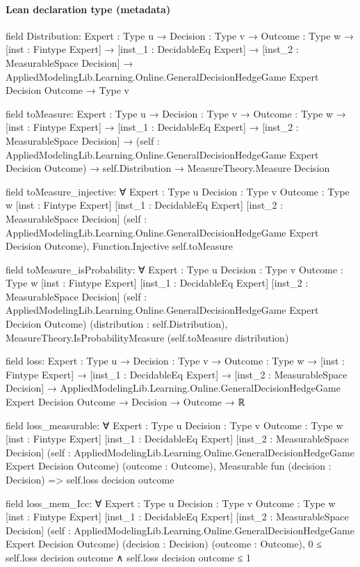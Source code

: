 \documentclass[10pt]{article}
\begin{document}
\paragraph{Lean declaration type (metadata)}
\begin{ReviewVerbatim}
field Distribution:
{Expert : Type u} →
  {Decision : Type v} →
    {Outcome : Type w} →
      [inst : Fintype Expert] →
        [inst_1 : DecidableEq Expert] →
          [inst_2 : MeasurableSpace Decision] →
            AppliedModelingLib.Learning.Online.GeneralDecisionHedgeGame Expert Decision Outcome → Type v

field toMeasure:
{Expert : Type u} →
  {Decision : Type v} →
    {Outcome : Type w} →
      [inst : Fintype Expert] →
        [inst_1 : DecidableEq Expert] →
          [inst_2 : MeasurableSpace Decision] →
            (self : AppliedModelingLib.Learning.Online.GeneralDecisionHedgeGame Expert Decision Outcome) →
              self.Distribution → MeasureTheory.Measure Decision

field toMeasure_injective:
∀ {Expert : Type u} {Decision : Type v} {Outcome : Type w} [inst : Fintype Expert] [inst_1 : DecidableEq Expert]
  [inst_2 : MeasurableSpace Decision]
  (self : AppliedModelingLib.Learning.Online.GeneralDecisionHedgeGame Expert Decision Outcome),
  Function.Injective self.toMeasure

field toMeasure_isProbability:
∀ {Expert : Type u} {Decision : Type v} {Outcome : Type w} [inst : Fintype Expert] [inst_1 : DecidableEq Expert]
  [inst_2 : MeasurableSpace Decision]
  (self : AppliedModelingLib.Learning.Online.GeneralDecisionHedgeGame Expert Decision Outcome)
  (distribution : self.Distribution), MeasureTheory.IsProbabilityMeasure (self.toMeasure distribution)

field loss:
{Expert : Type u} →
  {Decision : Type v} →
    {Outcome : Type w} →
      [inst : Fintype Expert] →
        [inst_1 : DecidableEq Expert] →
          [inst_2 : MeasurableSpace Decision] →
            AppliedModelingLib.Learning.Online.GeneralDecisionHedgeGame Expert Decision Outcome → Decision → Outcome → ℝ

field loss_measurable:
∀ {Expert : Type u} {Decision : Type v} {Outcome : Type w} [inst : Fintype Expert] [inst_1 : DecidableEq Expert]
  [inst_2 : MeasurableSpace Decision]
  (self : AppliedModelingLib.Learning.Online.GeneralDecisionHedgeGame Expert Decision Outcome) (outcome : Outcome),
  Measurable fun (decision : Decision) => self.loss decision outcome

field loss_mem_Icc:
∀ {Expert : Type u} {Decision : Type v} {Outcome : Type w} [inst : Fintype Expert] [inst_1 : DecidableEq Expert]
  [inst_2 : MeasurableSpace Decision]
  (self : AppliedModelingLib.Learning.Online.GeneralDecisionHedgeGame Expert Decision Outcome) (decision : Decision)
  (outcome : Outcome), 0 ≤ self.loss decision outcome ∧ self.loss decision outcome ≤ 1


\end{ReviewVerbatim}
\end{document}
